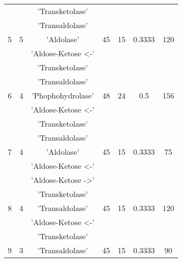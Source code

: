 \begin{center}
\begin{longtable}{ |c|c|c|c|c|c|c| }
 &  & 'Transketolase' & & & & \\
 &  & 'Transaldolase' & & & & \\
5 & 5 & 'Aldolase' & 45 & 15 & 0.3333 & 120\\
 \hline
 &  & 'Aldose-Ketose <-' & & & & \\
 &  & 'Transketolase' & & & & \\
 &  & 'Transaldolase' & & & & \\
6 & 4 & 'Phophohydrolase' & 48 & 24 & 0.5 & 156\\
 \hline
 &  & 'Aldose-Ketose <-' & & & & \\
 &  & 'Transketolase' & & & & \\
 &  & 'Transaldolase' & & & & \\
7 & 4 & 'Aldolase' & 45 & 15 & 0.3333 & 75\\
 \hline
 &  & 'Aldose-Ketose <-' & & & & \\
 &  & 'Aldose-Ketose ->' & & & & \\
 &  & 'Transketolase' & & & & \\
8 & 4 & 'Transaldolase' & 45 & 15 & 0.3333 & 120\\
 \hline
 &  & 'Aldose-Ketose <-' & & & & \\
 &  & 'Transketolase' & & & & \\
9 & 3 & 'Transaldolase' & 45 & 15 & 0.3333 & 90\\
 \hline
\end{longtable}
\end{center}
